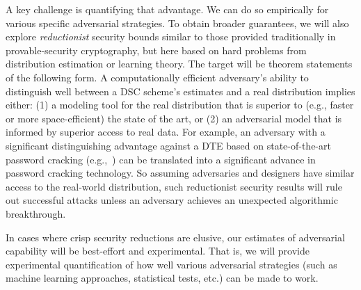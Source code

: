 A key challenge is quantifying that advantage.
We can do so empirically for various specific adversarial strategies. 
To obtain broader guarantees, we will also explore {\em reductionist} security bounds similar 
to those provided traditionally in provable-security 
cryptography, but here based on hard problems from distribution estimation or learning theory.
The target will be theorem statements of the following form. 
A computationally efficient adversary's ability to distinguish well between a
DSC scheme's estimates and a real distribution implies either: (1) a modeling tool for the
real distribution %
that is superior
to (e.g., faster or more space-efficient) the state of the art, or (2) an adversarial model that
is informed by superior access to real data. For example, an adversary with a
significant distinguishing advantage against a DTE based on state-of-the-art
password cracking (e.g.,~\cite{SweetPass:2014}) can be translated into a
significant advance in password cracking technology.
So assuming adversaries and designers
have similar access to the real-world distribution,  such reductionist
security results will rule out successful attacks unless an adversary
achieves an unexpected algorithmic breakthrough.  %

In cases where crisp security reductions are elusive, our estimates of
adversarial capability will be best-effort and experimental.
That is, we will provide experimental quantification of how well various
adversarial strategies (such as machine learning approaches, statistical tests,
etc.) can be made to work.  

\iffalse
\tnote{This idea just occurred to me. For the steganography case it somehow
seems a bit likely that we can do this, since the adversarial game is a bunch of
real samples versus a bunch of fake samples. But what would this ``improvement''
be, and how can we show a reduction to it? We need to formalize the estimation
problem. Perhaps we can use learning theory.}
\fi

